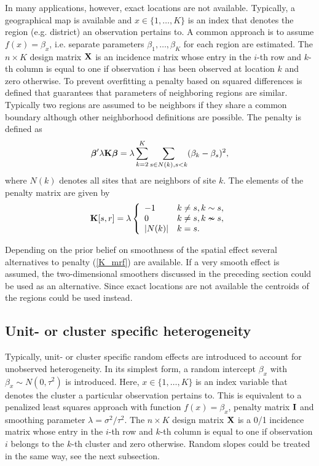 \documentclass[11pt,a4paper,twoside]{bayesxarticle}
\begin{document}
In many applications, however, exact locations are not available. Typically, a geographical map is available and $x \in \{1,\dots,K\}$ is an
index that denotes the region (e.g. district) an observation pertains to. A common approach is to assume $f(x) = \beta_x$,
i.e. separate parameters $\beta_1,\ldots,\beta_K$  for each region are estimated.
The $n \times K$ design matrix $\mathbf{X}$ is an incidence matrix whose entry in
the $i$-th row and $k$-th column is equal to one if observation $i$ has been observed at
location $k$ and zero otherwise. To prevent overfitting a penalty based on squared differences is defined that
guarantees that parameters of neighboring regions are similar. Typically two regions are assumed to be neighbors if they share a common
boundary although other neighborhood definitions are possible. The penalty is defined as
$$
\boldsymbol{\beta}' \lambda \mathbf{K} \boldsymbol{\beta} = \lambda\sum_{k=2}^{K}\sum_{s \in N(k), s < k}(\beta_k-\beta_s)^2,
$$
where $N(k)$ denotes all sites that are neighbors of site $k$.
The elements of the penalty matrix are given by
\begin{equation}
\label{K_mrf}
 \Kvec[s,r] = \lambda \left\{
 \begin{array}{ll}
-1 & k\neq s, k\sim s,\\
 0 & k\neq s, k \nsim s,\\
 |N(k)| & k=s.
\end{array}
\right.
\end{equation}

Depending on the prior belief on smoothness of the spatial effect
several alternatives to penalty (\ref{K_mrf}) are available. If a
very smooth effect is assumed, the two-dimensional smoothers
discussed in the preceding section could be used as an alternative.
Since exact locations are not available the centroids of the regions
could be used instead.

\subsection{Unit- or cluster specific heterogeneity}
Typically, unit- or cluster specific random effects are introduced
to account for unobserved heterogeneity. In its simplest form, a
random intercept $\beta_x$ with $\beta_x \sim N(0,\tau^2)$ is
introduced. Here, $x \in \{1,\dots,K\}$ is an index variable that
denotes the cluster a particular observation pertains to. This is
equivalent to a penalized least squares approach with function $f(x)
= \beta_x$, penalty matrix $\mathbf{I}$ and smoothing parameter $\lambda
= \sigma^2/\tau^2$. The $n \times K$ design matrix $\mathbf{X}$ is a 0/1
incidence matrix whose entry in the $i$-th row and $k$-th column is
equal to one if observation $i$ belongs to the $k$-th cluster and
zero otherwise. Random slopes could be treated in the same way, see
the next subsection.
\end{document}
